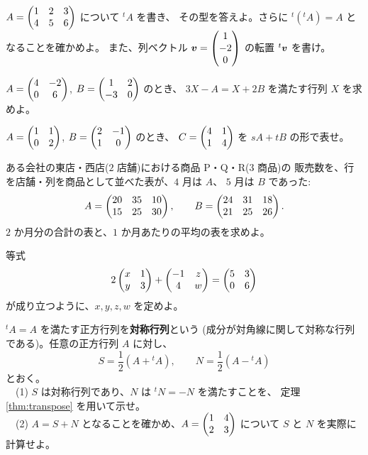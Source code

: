 \begin{mondai}[基本]\label{q:mat-ex4}
$A = \begin{pmatrix}1 & 2 & 3 \\ 4 & 5 & 6\end{pmatrix}$ について ${}^t\!A$ を書き、
その型を答えよ。さらに ${}^t({}^t\!A) = A$ となることを確かめよ。
また、列ベクトル $\bm{v} = \begin{pmatrix}1 \\ -2 \\ 0\end{pmatrix}$ の転置 ${}^t\bm{v}$ を書け。
\end{mondai}

\begin{mondai}[標準]\label{q:mat-ex5}
$A = \begin{pmatrix}4 & -2 \\ 0 & 6\end{pmatrix}$, $B = \begin{pmatrix}1 & 2 \\ -3 & 0\end{pmatrix}$ のとき、
$3X - A = X + 2B$ を満たす行列 $X$ を求めよ。
\end{mondai}

\begin{mondai}[標準]\label{q:mat-ex6}
$A = \begin{pmatrix}1 & 1 \\ 0 & 2\end{pmatrix}$, $B = \begin{pmatrix}2 & -1 \\ 1 & 0\end{pmatrix}$ のとき、
$C = \begin{pmatrix}4 & 1 \\ 1 & 4\end{pmatrix}$ を $sA + tB$ の形で表せ。
\end{mondai}

\begin{mondai}[標準]\label{q:mat-ex7}
ある会社の東店・西店($2$ 店舗)における商品 P・Q・R($3$ 商品)の
販売数を、行を店舗・列を商品として並べた表が、$4$ 月は $A$、
$5$ 月は $B$ であった:
\[
A = \begin{pmatrix}20 & 35 & 10 \\ 15 & 25 & 30\end{pmatrix}, \qquad
B = \begin{pmatrix}24 & 31 & 18 \\ 21 & 25 & 26\end{pmatrix}.
\]
$2$ か月分の合計の表と、$1$ か月あたりの平均の表を求めよ。
\end{mondai}

\begin{mondai}[標準]\label{q:mat-ex8}
等式
\[
2\begin{pmatrix}x & 1 \\ y & 3\end{pmatrix} + \begin{pmatrix}-1 & z \\ 4 & w\end{pmatrix} = \begin{pmatrix}5 & 3 \\ 0 & 6\end{pmatrix}
\]
が成り立つように、$x, y, z, w$ を定めよ。
\end{mondai}

\begin{mondai}[発展]\label{q:mat-ex9}
${}^t\!A = A$ を満たす正方行列を\textbf{対称行列}という
(成分が対角線に関して対称な行列である)。任意の正方行列 $A$ に対し、
\[
S = \frac{1}{2}(A + {}^t\!A), \qquad N = \frac{1}{2}(A - {}^t\!A)
\]
とおく。\\
　(1) $S$ は対称行列であり、$N$ は ${}^t\!N = -N$ を満たすことを、
定理 \ref{thm:transpose} を用いて示せ。\\
　(2) $A = S + N$ となることを確かめ、$A = \begin{pmatrix}1 & 4 \\ 2 & 3\end{pmatrix}$ について
$S$ と $N$ を実際に計算せよ。
\end{mondai}

